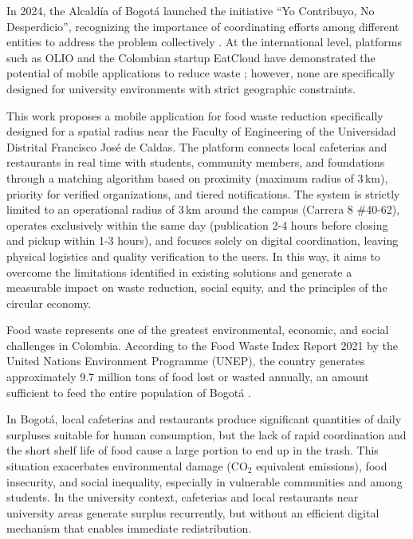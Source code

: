 \documentclass[conference]{IEEEtran}
\begin{document}
In 2024, the Alcaldía of Bogotá launched the initiative ``Yo Contribuyo, No Desperdicio'', recognizing the importance of coordinating efforts among different entities to address the problem collectively \cite{bogota2024}. At the international level, platforms such as OLIO \cite{olio2024} and the Colombian startup EatCloud have demonstrated the potential of mobile applications to reduce waste \cite{eatcloud2025}; however, none are specifically designed for university environments with strict geographic constraints.

This work proposes a mobile application for food waste reduction specifically designed for a spatial radius near the Faculty of Engineering of the Universidad Distrital Francisco José de Caldas. The platform connects local cafeterias and restaurants in real time with students, community members, and foundations through a matching algorithm based on proximity (maximum radius of 3\,km), priority for verified organizations, and tiered notifications. The system is strictly limited to an operational radius of 3\,km around the campus (Carrera 8 \#40-62), operates exclusively within the same day (publication 2-4 hours before closing and pickup within 1-3 hours), and focuses solely on digital coordination, leaving physical logistics and quality verification to the users. In this way, it aims to overcome the limitations identified in existing solutions and generate a measurable impact on waste reduction, social equity, and the principles of the circular economy.

Food waste represents one of the greatest environmental, economic, and social challenges in Colombia. According to the Food Waste Index Report 2021 by the United Nations Environment Programme (UNEP), the country generates approximately 9.7 million tons of food lost or wasted annually, an amount sufficient to feed the entire population of Bogotá \cite{unep2021}. 

In Bogotá, local cafeterias and restaurants produce significant quantities of daily surpluses suitable for human consumption, but the lack of rapid coordination and the short shelf life of food cause a large portion to end up in the trash. This situation exacerbates environmental damage (CO$_2$ equivalent emissions), food insecurity, and social inequality, especially in vulnerable communities and among students. In the university context, cafeterias and local restaurants near university areas generate surplus recurrently, but without an efficient digital mechanism that enables immediate redistribution.
\end{document}
